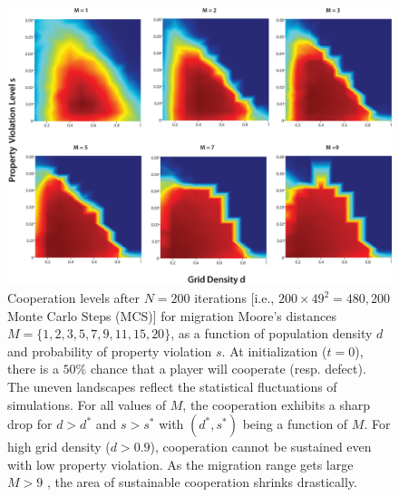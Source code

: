\begin{figure}[h]
\begin{center}
\centerline{\includegraphics[width=14cm]{../figures2/heatmaps.eps}}
\caption{Cooperation levels after $N=200$ iterations [i.e., $200 \times 49^2 = 480,200$ Monte Carlo Steps (MCS)] for migration Moore's distances $M = \{1,2,3,5,7,9,11,15,20 \}$, as a function of population density $d$ and probability of property violation $s$. At initialization ($t=0$), there is a $50\%$ chance that a player will cooperate (resp. defect). The uneven landscapes reflect the statistical fluctuations of simulations. For all values of $M$, the cooperation exhibits a sharp drop for $d > d^*$  and $s > s^*$ with $(d^*,s^*)$ being a function of $M$. For high grid density ($d > 0.9$), cooperation cannot be sustained even with low property violation. As the migration range gets large $M > 9$ , the area of sustainable cooperation shrinks drastically.%
}
\label{fig:heatmaps}
\end{center}
\end{figure}


